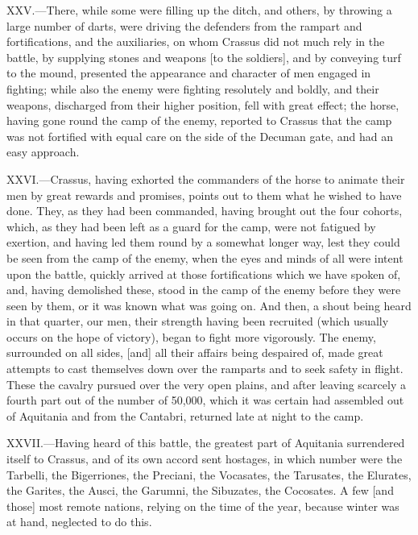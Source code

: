 XXV.—There, while some were filling up the ditch, and others, by
throwing a large number of darts, were driving the defenders from the
rampart and fortifications, and the auxiliaries, on whom Crassus did not
much rely in the battle, by supplying stones and weapons [to the
soldiers], and by conveying turf to the mound, presented the appearance
and character of men engaged in fighting; while also the enemy were
fighting resolutely and boldly, and their weapons, discharged from their
higher position, fell with great effect; the horse, having gone round
the camp of the enemy, reported to Crassus that the camp was not
fortified with equal care on the side of the Decuman gate, and had an
easy approach.

XXVI.—Crassus, having exhorted the commanders of the horse to animate
their men by great rewards and promises, points out to them what he
wished to have done. They, as they had been commanded, having brought
out the four cohorts, which, as they had been left as a guard for the
camp, were not fatigued by exertion, and having led them round by a
somewhat longer way, lest they could be seen from the camp of the enemy,
when the eyes and minds of all were intent upon the battle, quickly
arrived at those fortifications which we have spoken of, and, having
demolished these, stood in the camp of the enemy before they were seen
by them, or it was known what was going on. And then, a shout being
heard in that quarter, our men, their strength having been recruited
(which usually occurs on the hope of victory), began to fight more
vigorously. The enemy, surrounded on all sides, [and] all their affairs
being despaired of, made great attempts to cast themselves down over the
ramparts and to seek safety in flight. These the cavalry pursued over
the very open plains, and after leaving scarcely a fourth part out of
the number of 50,000, which it was certain had assembled out of
Aquitania and from the Cantabri, returned late at night to the camp.

XXVII.—Having heard of this battle, the greatest part of Aquitania
surrendered itself to Crassus, and of its own accord sent hostages, in
which number were the Tarbelli, the Bigerriones, the Preciani, the
Vocasates, the Tarusates, the Elurates, the Garites, the Ausci, the
Garumni, the Sibuzates, the Cocosates. A few [and those] most remote
nations, relying on the time of the year, because winter was at hand,
neglected to do this.

